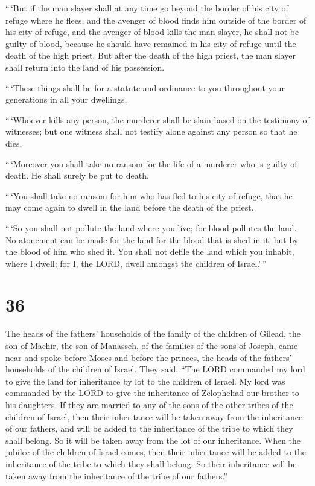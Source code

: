  ``\,`But if the man slayer shall at any time go beyond the
border of his city of refuge where he flees,  and the
avenger of blood finds him outside of the border of his city of refuge,
and the avenger of blood kills the man slayer, he shall not be guilty of
blood,  because he should have remained in his city of
refuge until the death of the high priest. But after the death of the
high priest, the man slayer shall return into the land of his
possession.

 ``\,`These things shall be for a statute and ordinance to
you throughout your generations in all your dwellings.

 ``\,`Whoever kills any person, the murderer shall be slain
based on the testimony of witnesses; but one witness shall not testify
alone against any person so that he dies.

 ``\,`Moreover you shall take no ransom for the life of a
murderer who is guilty of death. He shall surely be put to death.

 ``\,`You shall take no ransom for him who has fled to his
city of refuge, that he may come again to dwell in the land before the
death of the priest.

 ``\,`So you shall not pollute the land where you live; for
blood pollutes the land. No atonement can be made for the land for the
blood that is shed in it, but by the blood of him who shed it.
 You shall not defile the land which you inhabit, where I
dwell; for I, the LORD, dwell amongst the children of Israel.'\,''

\hypertarget{section-35}{%
\section{36}\label{section-35}}

 The heads of the fathers' households of the family of the
children of Gilead, the son of Machir, the son of Manasseh, of the
families of the sons of Joseph, came near and spoke before Moses and
before the princes, the heads of the fathers' households of the children
of Israel.  They said, ``The LORD commanded my lord to give
the land for inheritance by lot to the children of Israel. My lord was
commanded by the LORD to give the inheritance of Zelophehad our brother
to his daughters.  If they are married to any of the sons of
the other tribes of the children of Israel, then their inheritance will
be taken away from the inheritance of our fathers, and will be added to
the inheritance of the tribe to which they shall belong. So it will be
taken away from the lot of our inheritance.  When the
jubilee of the children of Israel comes, then their inheritance will be
added to the inheritance of the tribe to which they shall belong. So
their inheritance will be taken away from the inheritance of the tribe
of our fathers.''

